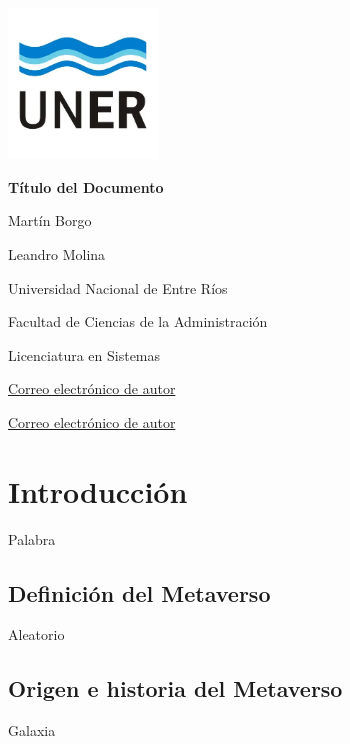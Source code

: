 \documentclass[a4paper,10pt]{article}
\begin{document}
	\pagestyle{empty}
	\begin{titlepage}
		\centering
		\vspace*{1.5cm}
		\includegraphics[width=0.3\textwidth]{unerlogo.png}
		\linebreak
		{\fontsize{14}{17}\bfseries Título del Documento\par}
		{\small Martín Borgo\par}
		{\small Leandro Molina\par}
		{\normalsize Universidad Nacional de Entre Ríos\par}
		{\normalsize Facultad de Ciencias de la Administración\par}
		{\normalsize Licenciatura en Sistemas \par}
		{\small \href{mailto:LeandroRodrigoMolina@gmail.com}{Correo electrónico de autor}\par}
		{\small \href{mailto:correo@ejemplo.com}{Correo electrónico de autor}\par}
		
		
	\end{titlepage}
	
	\tableofcontents
	\thispagestyle{empty}
	\newpage
	\section{Introducción}
	Palabra
	\subsection{Definición del Metaverso}
	Aleatorio
	\subsection{Origen e historia del Metaverso}
	Galaxia
\end{document}
